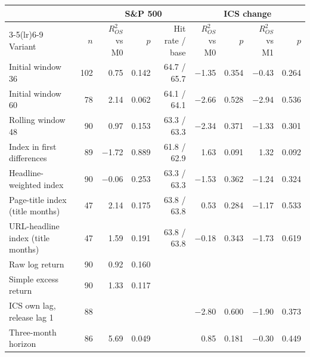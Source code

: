 \begin{tabular}{lrrrrrrrr}
\toprule
 &  & \multicolumn{3}{c}{S\&P 500} & \multicolumn{4}{c}{ICS change} \\
\cmidrule(lr){3-5}\cmidrule(lr){6-9}
Variant & $n$ & $R^2_{OS}$ vs M0 & $p$ & Hit rate / base & $R^2_{OS}$ vs M0 & $p$ & $R^2_{OS}$ vs M1 & $p$ \\
\midrule
Initial window 36 & 102 & 0.75 & 0.142 & 64.7 / 65.7 & $-$1.35 & 0.354 & $-$0.43 & 0.264 \\
Initial window 60 & 78 & 2.14 & 0.062 & 64.1 / 64.1 & $-$2.66 & 0.528 & $-$2.94 & 0.536 \\
Rolling window 48 & 90 & 0.97 & 0.153 & 63.3 / 63.3 & $-$2.34 & 0.371 & $-$1.33 & 0.301 \\
\midrule
Index in first differences & 89 & $-$1.72 & 0.889 & 61.8 / 62.9 & 1.63 & 0.091 & 1.32 & 0.092 \\
Headline-weighted index & 90 & $-$0.06 & 0.253 & 63.3 / 63.3 & $-$1.53 & 0.362 & $-$1.24 & 0.324 \\
Page-title index (title months) & 47 & 2.14 & 0.175 & 63.8 / 63.8 & 0.53 & 0.284 & $-$1.17 & 0.533 \\
URL-headline index (title months) & 47 & 1.59 & 0.191 & 63.8 / 63.8 & $-$0.18 & 0.343 & $-$1.73 & 0.619 \\
\midrule
Raw log return & 90 & 0.92 & 0.160 &  &  &  &  &  \\
Simple excess return & 90 & 1.33 & 0.117 &  &  &  &  &  \\
ICS own lag, release lag 1 & 88 &  &  &  & $-$2.80 & 0.600 & $-$1.90 & 0.373 \\
\midrule
Three-month horizon & 86 & 5.69 & 0.049 &  & 0.85 & 0.181 & $-$0.30 & 0.449 \\
\bottomrule
\end{tabular}
